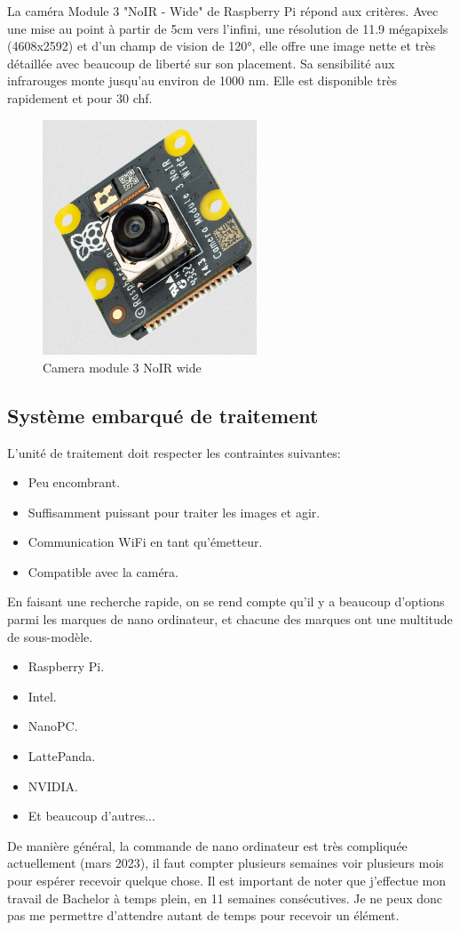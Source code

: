 La caméra Module 3 "NoIR - Wide" de Raspberry Pi \cite{camera} répond aux critères. Avec une mise au point à partir de 5cm vers l'infini,
une résolution de 11.9 mégapixels (4608x2592) et d'un champ de vision de \ang{120}, elle offre une image nette et très détaillée avec beaucoup de liberté sur
son placement. Sa sensibilité aux infrarouges monte jusqu'au environ de 1000 \si{\nano\metre}. Elle est disponible très rapidement et pour 30 \gls{chf}.
\begin{figure}[H]
    \centering
    \includegraphics[height=7cm,angle=-90]{assets/figures/camera.png}
    \caption{Camera module 3 NoIR wide}
\end{figure}
\newpage
\subsection{Système embarqué de traitement}
L'unité de traitement doit respecter les contraintes suivantes:
\begin{itemize}
    \item Peu encombrant.
    \item Suffisamment puissant pour traiter les images et agir.
    \item Communication WiFi en tant qu'émetteur.
    \item Compatible avec la caméra.
\end{itemize}
En faisant une recherche rapide, on se rend compte qu'il y a beaucoup d'options parmi les marques de nano ordinateur,
et chacune des marques ont une multitude de sous-modèle.
\begin{itemize}
    \item Raspberry Pi.
    \item Intel.
    \item NanoPC.
    \item LattePanda.
    \item NVIDIA.
    \item Et beaucoup d'autres...
\end{itemize}
De manière général, la commande de nano ordinateur est très compliquée actuellement (mars 2023), il faut compter plusieurs semaines voir plusieurs mois
pour espérer recevoir quelque chose. Il est important de noter que j'effectue mon travail de Bachelor à temps plein, en 11 semaines consécutives.
Je ne peux donc pas me permettre d'attendre autant de temps pour recevoir un élément.

